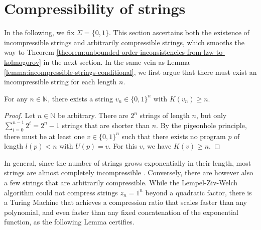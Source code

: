\section{Compressibility of strings}
\label{sec:compressibility}
In the following, we fix $\Sigma=\{0,1\}$.
This section ascertains both the existence of incompressible strings and arbitrarily compressible strings, which smooths the way to Theorem \ref{theorem:unbounded-order-inconsistencies-from-lzw-to-kolmogorov} in the next section.
In the same vein as Lemma \ref{lemma:incompressible-strings-conditional}, we first argue that there must exist an incompressible string for each length $n$.
\begin{lemma}
	\label{lemma:incompressible-strings}
	For any $n\in\mathbb{N}$, there exists a string $v_n\in\{0,1\}^n$ with $K(v_n)\geq n$.
\end{lemma}
\begin{proof}
	Let $n\in\mathbb{N}$ be arbitrary.
	There are $2^n$ strings of length $n$, but only $\sum_{i=0}^{n-1}2^i=2^{n}-1$ strings that are shorter than $n$. 
	By the pigeonhole principle, there must be at least one $v\in\{0,1\}^n$ such that there exists no program $p$ of length $l(p)<n$ with $U(p)=v$.
	For this $v$, we have $K(v)\geq n$.
\end{proof}
In general, since the number of strings grows exponentially in their length, most strings are almost completely incompressible \cite{li2008kolmogorov}. 
Conversely, there are however also a few strings that are arbitrarily compressible.
While the Lempel-Ziv-Welch algorithm could not compress strings $z_n=1^n$ beyond a quadratic factor, there is a Turing Machine that achieves a compression ratio that scales faster than any polynomial, and even faster than any fixed concatenation of the exponential function, as the following Lemma certifies.

